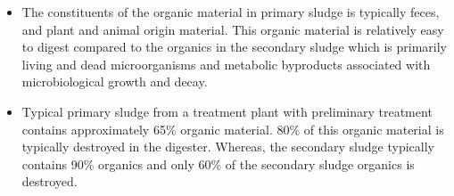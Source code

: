 \begin{itemize}
                        \item The constituents of the organic material in primary sludge is typically feces, and plant and animal origin material.  This organic material is relatively easy to digest compared to the organics in the secondary sludge which is primarily living and dead microorganisms and metabolic byproducts associated with microbiological growth and decay.
                        \item Typical primary sludge from a treatment plant with preliminary treatment contains approximately 65\% organic material.  80\% of this organic material is typically destroyed in the digester.  Whereas, the secondary sludge typically contains 90\% organics and only 60\% of the secondary sludge organics is destroyed.
                    \end{itemize}

